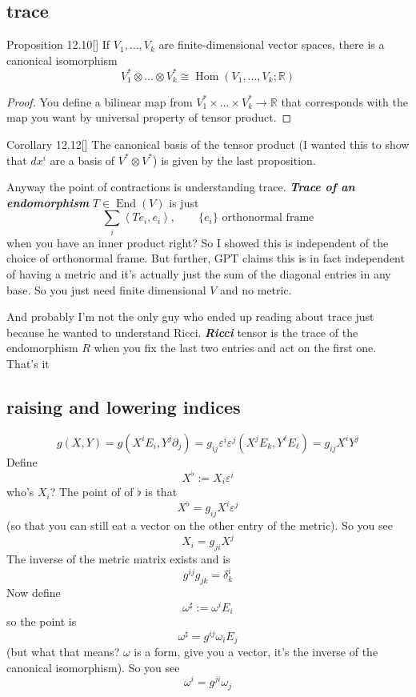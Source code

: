 \subsection{trace}

\begin{thing4}{Proposition 12.10}[\cite{les}]\label{prop:12.10}\leavevmode
If  \(V_1,\ldots,V_k\) are finite-dimensional vector spaces, there is a canonical isomorphism
\[V_1^*  \otimes\ldots \otimes V^*_k \cong \operatorname{Hom}(V_1,\ldots,V_k;\mathbb{R})\]
\end{thing4}
\begin{proof}\leavevmode
You define a bilinear map from \(V^*_1 \times \ldots \times V^*_k \to \mathbb{R}\) that corresponds with the map you want by universal property of tensor product.
\end{proof}

\begin{thing6}{Corollary 12.12}[\cite{les}]\leavevmode
The canonical basis of the tensor product (I wanted this to show that \(dx^i\) are a basis of \(V^* \otimes V^*\)) is given by the last proposition.
\end{thing6}

Anyway the point of contractions is understanding trace. \textit{\textbf{Trace of an endomorphism}} \(T \in \operatorname{End}(V)\) is just
\[\sum_i \left<Te_i,e_i\right>,\qquad \{e_i\}\text{ orthonormal frame} \]
when you have an inner product right? So I showed this is independent of the choice of orthonormal frame. But further, GPT claims this is in fact independent of having a metric and it's actually just the sum of the diagonal entries in any base. So you just need finite dimensional \(V\) and no metric.

And probably I'm not the only guy who ended up reading about trace just because he wanted to understand Ricci. \textit{\textbf{Ricci}} tensor is the trace of the endomorphism  \(R\) when you fix the last two entries and act on the first one. That's it

\subsection{raising and lowering indices}

\[g(X,Y)=g(X^iE_i,Y^j\partial_j)=g_{ij}\varepsilon^i\varepsilon^j(X^jE_k,Y^\ell E_\ell)=g_{ij}X^iY^j\]
Define
\[X^\flat:=X_i\varepsilon^i\]
who's \(X_i\)? The point of of \(\flat\) is that
\[X^\flat =g_{ij}X^i\varepsilon^j\]
(so that you can still eat a vector on the other entry of the metric). So you see
\[X_i=g_{ji}X^j\]
The inverse of the metric matrix exists and is
\[g^{ij}g_{j k}=\delta^i_k\]
Now define
\[\omega^\sharp:=\omega^iE_i\]
so the point is
\[\omega^\sharp=g^{ij}\omega_iE_j\]
(but what that means? \(\omega\) is a form, give you a vector, it's the inverse of the canonical isomorphism). So you see
\[\omega^i=g^{ji}\omega_j\]



